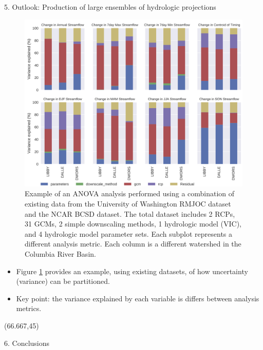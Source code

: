 \documentclass{beamer}
\begin{document}
\begin{frame}{}
\begin{columns}
\begin{column}{.3333\paperwidth}
\begin{textblock}{\textwidth \TPHorizModule}
\begin{block}{5. Outlook: Production of large ensembles of hydrologic projections}
     \begin{figure}
      \center\includegraphics[width=0.75\linewidth]{figures/anova.png}
      \caption{Example of an ANOVA analysis performed using a combination of existing data from the University of Washington RMJOC dataset and the NCAR BCSD dataset. The total dataset includes 2 RCPs, 31 GCMs, 2 simple downscaling methods, 1 hydrologic model (VIC), and 4 hydrologic model parameter sets. Each subplot represents a different analysis metric. Each column is a different watershed in the Columbia River Basin.
       \label{fig:anova}}
     \end{figure}

     \begin{itemize}
      \justifying
      \item Figure \ref{fig:anova} provides an example, using existing datasets, of how uncertainty (variance) can be partitioned.
      \item Key point: the variance explained by each variable is differs between analysis metrics.
     \end{itemize}

    \end{block}
   \end{textblock}

   \begin{textblock}{\textwidth \TPHorizModule}(66.667,45)


    \begin{block}{6. Conclusions}


\end{block}
\end{textblock}
\end{column}
\end{columns}
\end{frame}
\end{document}
